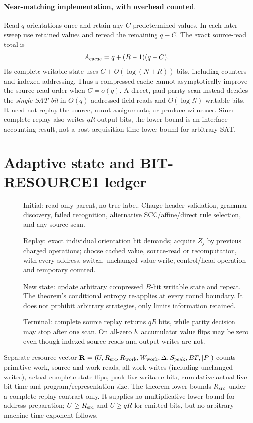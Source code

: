 \documentclass[11pt]{article}
\begin{document}
\paragraph{Near-matching implementation, with overhead counted.}
Read $q$ orientations once and retain any $C$ predetermined values. In each later sweep use retained values and reread the remaining $q-C$. The exact source-read total is
\[
A_{\rm cache}=q+(R-1)(q-C).
\]
Its complete writable state uses $C+O(\log(N+R))$ bits, including counters and indexed addressing. Thus a compressed cache cannot asymptotically improve the source-read order when $C=o(q)$. A direct, paid parity scan instead decides the \emph{single SAT bit} in $O(q)$ addressed field reads and $O(\log N)$ writable bits. It need not replay the source, count assignments, or produce witnesses. Since complete replay also writes $qR$ output bits, the lower bound is an interface-accounting result, not a post-acquisition time lower bound for arbitrary SAT.
\section{Adaptive state and BIT-RESOURCE1 ledger}
\begin{description}
\item[] Initial: read-only parent, no true label. Charge header validation, grammar discovery, failed recognition, alternative SCC/affine/direct rule selection, and any source scan.
\item[] Replay: exact individual orientation bit demands; acquire $Z_j$ by previous charged operations; choose cached value, source-read or recomputation, with every address, switch, unchanged-value write, control/head operation and temporary counted.
\item[] New state: update arbitrary compressed $B$-bit writable state and repeat. The theorem's conditional entropy re-applies at every round boundary. It does not prohibit arbitrary strategies, only limits information retained.
\item[] Terminal: complete source replay returns $qR$ bits, while parity decision may stop after one scan. On all-zero $b$, accumulator value flips may be zero even though indexed source reads and output writes are not.
\end{description}
Separate resource vector $\mathbf R=(U,R_{\rm src},R_{\rm work},W_{\rm work},\Delta,S_{\rm peak},BT,|P|)$ counts primitive work, source and work reads, all work writes (including unchanged writes), actual complete-state flips, peak live writable bits, cumulative actual live-bit-time and program/representation size. The theorem lower-bounds $R_{\rm src}$ under a complete replay contract only. It supplies no multiplicative lower bound for address preparation; $U\ge R_{\rm src}$ and $U\ge qR$ for emitted bits, but no arbitrary machine-time exponent follows.
\end{document}
